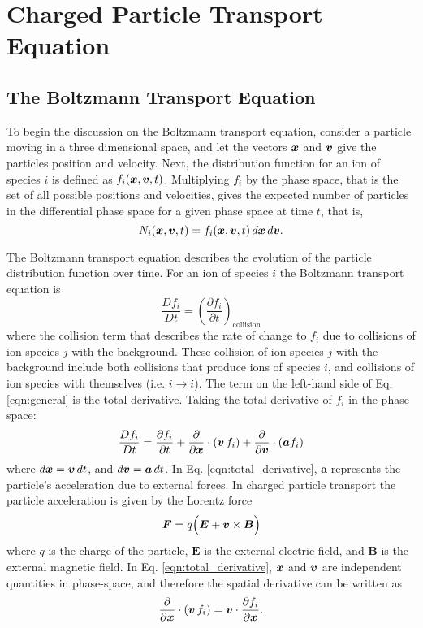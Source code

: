 \documentclass[../main.tex]{subfiles}
\begin{document}
\chapter{Charged Particle Transport Equation}

\section{The Boltzmann Transport Equation}
To begin the discussion on the Boltzmann transport equation, consider a particle moving in a three dimensional space, and let the vectors $\boldsymbol{x}$ and $\boldsymbol{v}$ give the particles position and velocity. Next, the distribution function for an ion of species $i$ is defined as $f_i(\boldsymbol{x},\boldsymbol{v},t)$. Multiplying $f_i$ by the phase space, that is the set of all possible positions and velocities, gives the expected number of particles in the differential phase space for a given phase space at time $t$, that is,
\begin{equation}
  N_i(\boldsymbol{x},\boldsymbol{v},t) = f_i(\boldsymbol{x},\boldsymbol{v},t) \, d\boldsymbol{x} \, d\boldsymbol{v}.
\end{equation}

The Boltzmann transport equation describes the evolution of the particle distribution function over time. For an ion of species $i$ the Boltzmann transport equation is
\begin{equation} \label{eqn:general}
  \dfrac{D f_i}{D t} = \left( \dfrac{\partial f_i}{\partial t} \right)_{\text{collision}}
\end{equation}
where the collision term that describes the rate of change to $f_i$ due to collisions of ion species $j$ with the background. These collision of ion species $j$ with the background include both collisions that produce ions of species $i$, and collisions of ion species with themselves (i.e. $i \rightarrow i$). The term on the left-hand side of Eq. \eqref{eqn:general} is the total derivative. Taking the total derivative of $f_i$ in the phase space:
\begin{equation} \label{eqn:total_derivative}
    \dfrac{D f_i}{Dt} = \dfrac{\partial f_i}{\partial t} + \dfrac{\partial}{\partial \Bx} \cdot \left( \Bv \, f_i \right) + \dfrac{\partial}{\partial \Bv} \cdot \left( \boldsymbol{a} f_i \right)
\end{equation}
where $d\boldsymbol{x} = \boldsymbol{v} \, dt$, and $d\boldsymbol{v} = \boldsymbol{a} \, dt$. In Eq. \eqref{eqn:total_derivative}, $\boldsymbol{a}$ represents the particle's acceleration due to external forces. In charged particle transport the particle acceleration is given by the Lorentz force
\begin{equation} \label{eqn:lorentz}
  \boldsymbol{F} = q \Big( \boldsymbol{E} + \Bv \times \boldsymbol{B} \Big)
\end{equation}
where $q$ is the charge of the particle, $\boldsymbol{E}$ is the external electric field, and $\boldsymbol{B}$ is the external magnetic field. In Eq. \eqref{eqn:total_derivative}, $\boldsymbol{x}$ and $\boldsymbol{v}$ are independent quantities in phase-space, and therefore the spatial derivative can be written as
\begin{equation} \label{eqn:spatial_derivative}
  \dfrac{\partial}{\partial \Bx} \cdot \left( \Bv \, f_i \right) = \Bv \cdot \dfrac{\partial f_i}{\partial \Bx}.
\end{equation}
\end{document}

